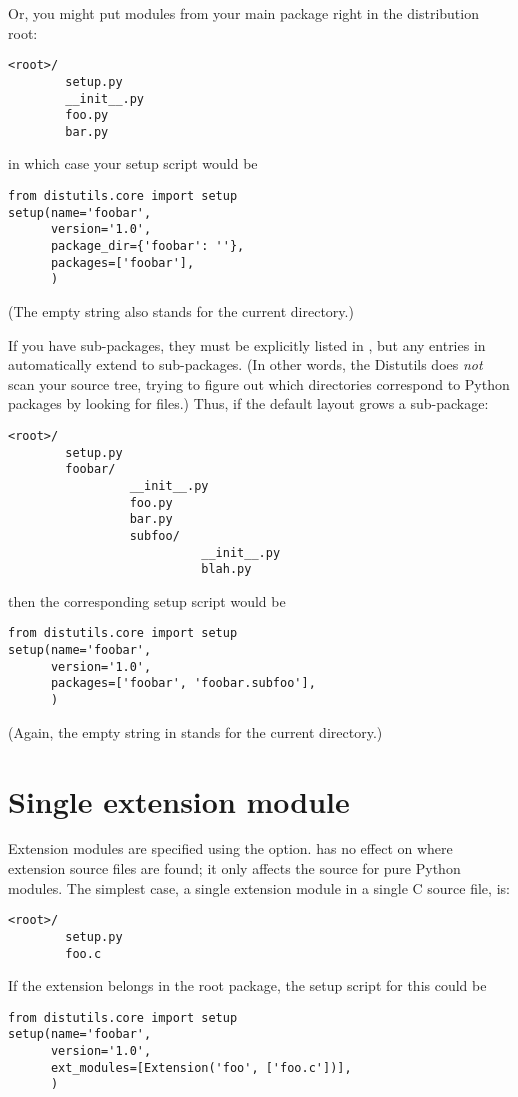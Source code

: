 \documentclass{manual}
\begin{document}
Or, you might put modules from your main package right in the
distribution root:
\begin{verbatim}
<root>/
        setup.py
        __init__.py
        foo.py
        bar.py
\end{verbatim}
in which case your setup script would be
\begin{verbatim}
from distutils.core import setup
setup(name='foobar',
      version='1.0',
      package_dir={'foobar': ''},
      packages=['foobar'],
      )
\end{verbatim}
(The empty string also stands for the current directory.)

If you have sub-packages, they must be explicitly listed in
, but any entries in 
automatically extend to sub-packages.  (In other words, the Distutils
does \emph{not} scan your source tree, trying to figure out which
directories correspond to Python packages by looking for
 files.)  Thus, if the default layout grows a
sub-package:
\begin{verbatim}
<root>/
        setup.py
        foobar/
                 __init__.py
                 foo.py
                 bar.py
                 subfoo/
                           __init__.py
                           blah.py
\end{verbatim}
then the corresponding setup script would be
\begin{verbatim}
from distutils.core import setup
setup(name='foobar',
      version='1.0',
      packages=['foobar', 'foobar.subfoo'],
      )
\end{verbatim}
(Again, the empty string in  stands for the current
directory.)


\section{Single extension module}
\label{single-ext}

Extension modules are specified using the  option.
 has no effect on where extension source files are
found; it only affects the source for pure Python modules.  The simplest 
case, a single extension module in a single C source file, is:
\begin{verbatim}
<root>/
        setup.py
        foo.c
\end{verbatim}
If the  extension belongs in the root package, the setup
script for this could be
\begin{verbatim}
from distutils.core import setup
setup(name='foobar',
      version='1.0',
      ext_modules=[Extension('foo', ['foo.c'])],
      )
\end{verbatim}
\end{document}

